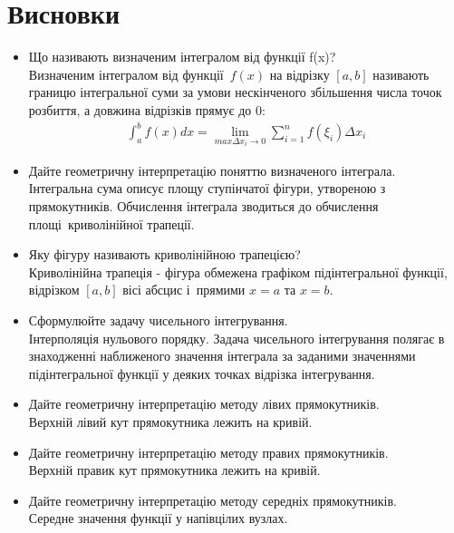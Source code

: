 \section{Висновки}
\label{seq:summary}

\begin{itemize}
      \item Що називають визначеним інтегралом від функції f(x)? \\
            Визначеним інтегралом від функції $f(x)$
            на відрізку $[a, b]$ називають границю
            інтегральної суми за умови нескінченого
            збільшення числа точок розбиття, а довжина
            відрізків прямує до 0:
            \begin{align}
                  \int_{a}^{b} f(x) dx = \lim_{max \Delta x_i \to 0}
                  \sum_{i = 1}^n f(\xi_i) \Delta x_i
            \end{align}
      \item Дайте геометричну інтерпретацію поняттю визначеного інтеграла. \\
            Інтегральна сума описує площу ступінчатої фігури,
            утвореною з прямокутників. Обчислення інтеграла
            зводиться до обчислення площі криволінійної трапеції.
      \item Яку фігуру називають криволінійною трапецією? \\
            Криволінійна трапеція - фігура обмежена графіком
            підінтегральної функції, відрізком $[a, b]$
            вісі абсцис і прямими $x = a$ та $x = b$.
      \item Сформулюйте задачу чисельного інтегрування. \\
            Інтерполяція нульового порядку.
            Задача чисельного інтегрування полягає в
            знаходженні наближеного значення інтеграла за
            заданими значеннями підінтегральної функції
            у деяких точках відрізка інтегрування.
      \item Дайте геометричну інтерпретацію методу лівих прямокутників. \\
            Верхній лівий кут прямокутника лежить на кривій.
      \item Дайте геометричну інтерпретацію методу правих прямокутників. \\
            Верхній правик кут прямокутника лежить на кривій.
      \item Дайте геометричну інтерпретацію методу середніх прямокутників. \\
            Середне значення функції у напівцілих вузлах.

\end{itemize}

